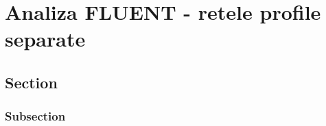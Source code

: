 \chapter{Analiza FLUENT - retele profile separate}\label{chapter:analiza}

\section{Section}

\subsection{Subsection}